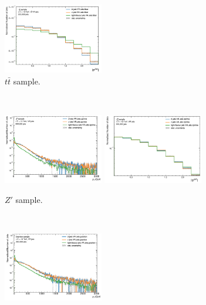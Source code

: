 \begin{figure}[h!]
\begin{subfigure}[b]{0.98\textwidth}
      \includegraphics[width=0.48\textwidth]{Images/FTAG/VRDips/JetDist/tteta.png}
      \caption{$t\bar{t}$ sample.} 
      \label{apfig:vrjetdistt}
  \end{subfigure}\\
  \begin{subfigure}[b]{0.98\textwidth}
      \centering
      \includegraphics[width=0.48\textwidth]{Images/FTAG/VRDips/JetDist/zppt.png}
      \includegraphics[width=0.48\textwidth]{Images/FTAG/VRDips/JetDist/zpeta.png}
      \caption{$Z'$ sample.} 
      \label{apfig:vrjetdiszp}
  \end{subfigure}\\
  \begin{subfigure}[b]{0.98\textwidth}
      \centering
      \includegraphics[width=0.48\textwidth]{Images/FTAG/VRDips/JetDist/grpt.png}

\end{subfigure}
\end{figure}
